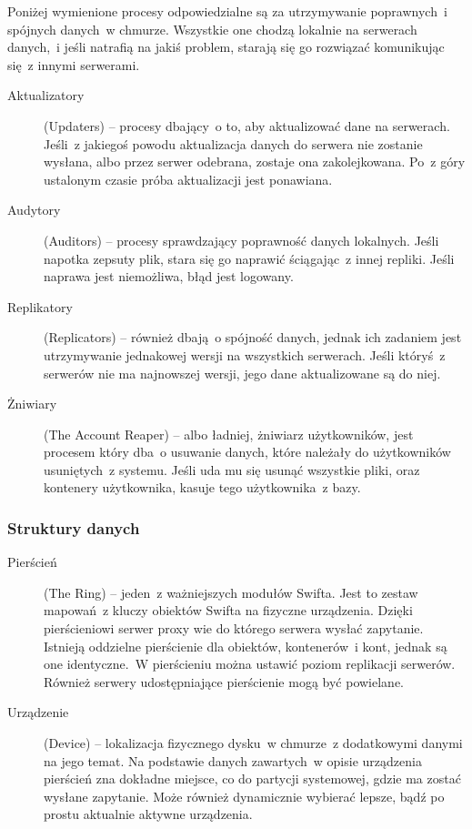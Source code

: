 Poniżej wymienione procesy odpowiedzialne są za utrzymywanie poprawnych~i spójnych danych~w chmurze. Wszystkie one chodzą lokalnie na serwerach danych,~i jeśli natrafią na jakiś problem, starają się go rozwiązać komunikując się~z innymi serwerami.

\begin{description}
\item[Aktualizatory] (Updaters) -- procesy dbający~o to, aby aktualizować dane na serwerach. Jeśli~z jakiegoś powodu aktualizacja danych do serwera nie zostanie wysłana, albo przez serwer odebrana, zostaje ona zakolejkowana. Po~z góry ustalonym czasie próba aktualizacji jest ponawiana.
\item[Audytory] (Auditors) -- procesy sprawdzający poprawność danych lokalnych. Jeśli napotka zepsuty plik, stara się go naprawić ściągając~z innej repliki. Jeśli naprawa jest niemożliwa, błąd jest logowany. 
\item[Replikatory] (Replicators) -- również dbają~o spójność danych, jednak ich zadaniem jest utrzymywanie jednakowej wersji na wszystkich serwerach. Jeśli któryś~z serwerów nie ma najnowszej wersji, jego dane aktualizowane są do niej.
\item[Żniwiary] (The Account Reaper) -- albo ładniej, żniwiarz użytkowników, jest procesem który dba~o usuwanie danych, które należały do użytkowników usuniętych~z systemu. Jeśli uda mu się usunąć wszystkie pliki, oraz kontenery użytkownika, kasuje tego użytkownika~z bazy.
\end{description}

\subsubsection{Struktury danych}\label{sub:struktury danych}

\begin{description}
\item[Pierścień] (The Ring) -- jeden~z ważniejszych modułów Swifta. Jest to zestaw mapowań~z kluczy obiektów Swifta na fizyczne urządzenia. Dzięki pierścieniowi serwer proxy wie do którego serwera wysłać zapytanie. Istnieją oddzielne pierścienie dla obiektów, kontenerów~i kont, jednak są one identyczne.~W pierścieniu można ustawić poziom replikacji serwerów. Również serwery udostępniające pierścienie mogą być powielane.
\item[Urządzenie] (Device) -- lokalizacja fizycznego dysku~w chmurze~z dodatkowymi danymi na jego temat. Na podstawie danych zawartych~w opisie urządzenia pierścień zna dokładne miejsce, co do partycji systemowej, gdzie ma zostać wysłane zapytanie. Może również dynamicznie wybierać lepsze, bądź po prostu aktualnie aktywne urządzenia.
\end{description}

